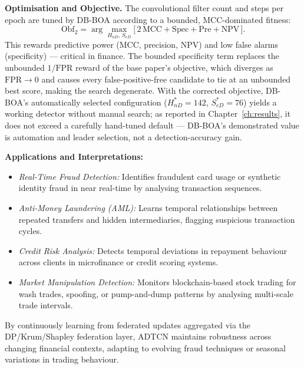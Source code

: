 \textbf{Optimisation and Objective.}
The convolutional filter count and steps per epoch are tuned by DB-BOA according to a bounded, MCC-dominated fitness:
\begin{equation}\label{eq:obf2_overview}
    \mathrm{Obf}_2 = \arg\max_{H_{nD},\, S_{eD}}
    \big[\, 2\,\mathrm{MCC} + \mathrm{Spec} + \mathrm{Pre} + \mathrm{NPV} \,\big].
\end{equation}
This rewards predictive power (MCC, precision, NPV) and low false alarms (specificity) — critical in finance. The bounded specificity term replaces the unbounded $1/\mathrm{FPR}$ reward of the base paper's objective, which diverges as $\mathrm{FPR}\to 0$ and causes every false-positive-free candidate to tie at an unbounded best score, making the search degenerate. With the corrected objective, DB-BOA's automatically selected configuration ($H_{nD}^\ast = 142$, $S_{eD}^\ast = 76$) yields a working detector without manual search; as reported in Chapter~\ref{ch:results}, it does not exceed a carefully hand-tuned default — DB-BOA's demonstrated value is automation and leader selection, not a detection-accuracy gain.

\textbf{Applications and Interpretations:}
\begin{itemize}
    \item \textit{Real-Time Fraud Detection:} Identifies fraudulent card usage or synthetic identity fraud in near real-time by analysing transaction sequences.
    \item \textit{Anti-Money Laundering (AML):} Learns temporal relationships between repeated transfers and hidden intermediaries, flagging suspicious transaction cycles.
    \item \textit{Credit Risk Analysis:} Detects temporal deviations in repayment behaviour across clients in microfinance or credit scoring systems.
    \item \textit{Market Manipulation Detection:} Monitors blockchain-based stock trading for wash trades, spoofing, or pump-and-dump patterns by analysing multi-scale trade intervals.
\end{itemize}

By continuously learning from federated updates aggregated via the DP/\allowbreak Krum/\allowbreak Shapley federation layer, ADTCN maintains robustness across changing financial contexts, adapting to evolving fraud techniques or seasonal variations in trading behaviour.

